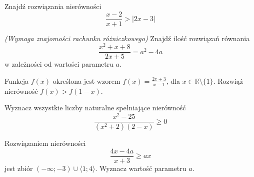 \zadanie Znajdź rozwiązania nierówności \[ \dfrac{x - 2}{x + 1} > |2x - 3| \]

\zadanie \textit{(Wymaga znajomości rachunku różniczkowego)} Znajdź ilość rozwiązań równania \[ \dfrac{x^2 + x + 8}{2x + 5} = a^2 - 4a \] w zależności od wartości parametru $a$.

\zadanie Funkcja $f(x)$ określona jest wzorem $f(x) = \frac{2x + 3}{x - 1}$, dla ${x \in \mathbb{R} \setminus \{1\}}$. Rozwiąż nierówność $f(x) > f(1 - x)$.

\zadanie Wyznacz wszystkie liczby naturalne spełniające nierówność \[\dfrac{x^2 - 25}{(x^2 + 2)(2 - x)} \geqslant 0\]

\zadanie Rozwiązaniem nierówności \[ \dfrac{4x - 4a}{x + 3} \geqslant ax \] jest zbiór $(-\infty; -3) \cup \langle 1; 4 \rangle$. Wyznacz wartość parametru $a$.